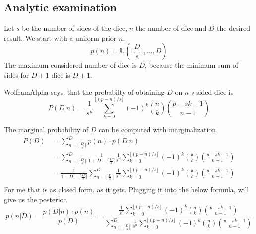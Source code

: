 \documentclass[10pt,a4paper]{article}
\begin{document}
\subsection{Analytic examination}

Let $s$ be the number of sides of the dice, $n$ the number of dice and $D$ the
desired result. We start with a uniform prior $n$.
\begin{equation}
  p(n) = \mathbb{U}\left( \lceil \frac{D}{s} \rceil, \dots, D \right)
\end{equation}
The maximum considered number of dice is $D$, because the minimum sum of sides
for $D + 1$ dice is $D + 1$.

WolframAlpha says, that the probabilty of obtaining $D$ on $n$ $s$-sided dice is
\begin{equation}
  P(D | n) = \frac{1}{s^{n}} \sum_{k = 0}^{\lfloor (p - n) / s \rfloor} (-1)^{k} \binom{n}{k} \binom{p - sk - 1}{n - 1}
\end{equation}

The marginal probability of $D$ can be computed with marginalization
\begin{align*}
  P(D) & = \sum_{n = \lceil \frac{D}{s} \rceil}^{D} p(n) \cdot p(D | n)\\
       & = \sum_{n = \lceil \frac{D}{s} \rceil}^{D} \frac{1}{1 + D - \lceil \frac{D}{s} \rceil} \frac{1}{s^{n}} \sum_{k = 0}^{\lfloor (p - n) / s \rfloor} (-1)^{k} \binom{n}{k} \binom{p - sk - 1}{n - 1}\\
       & = \frac{1}{1 + D - \lceil \frac{D}{s} \rceil} \sum_{n = \lceil \frac{D}{s} \rceil}^{D} \frac{1}{s^{n}} \sum_{k = 0}^{\lfloor (p - n) / s \rfloor} (-1)^{k} \binom{n}{k} \binom{p - sk - 1}{n - 1}\\
\end{align*}
For me that is as closed form, as it gets. Plugging it into the below formula,
will give us the posterior.
\begin{equation}
  p(n | D) = \frac{p(D | n) \cdot p(n)}{p(D)} = \frac{\frac{1}{s^{n}} \sum_{k = 0}^{\lfloor (p - n) / s \rfloor} (-1)^{k} \binom{n}{k} \binom{p - sk - 1}{n - 1}}{\sum_{n = \lceil \frac{D}{s} \rceil}^{D} \frac{1}{s^{n}} \sum_{k = 0}^{\lfloor (p - n) / s \rfloor} (-1)^{k} \binom{n}{k} \binom{p - sk - 1}{n - 1}}
\end{equation}
\end{document}
